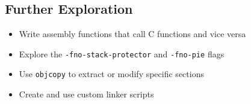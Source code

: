 \subsection{Further Exploration}
\begin{itemize}
\item Write assembly functions that call C functions and vice versa
\item Explore the \texttt{-fno-stack-protector} and \texttt{-fno-pie} flags
\item Use \texttt{objcopy} to extract or modify specific sections
\item Create and use custom linker scripts
\end{itemize}

